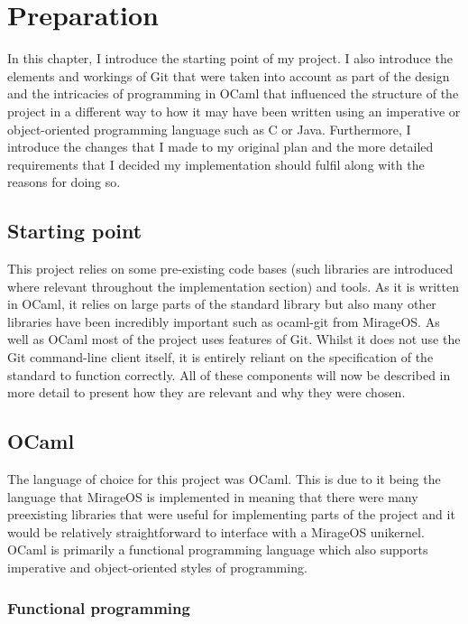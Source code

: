 \chapter{Preparation}

In this chapter, I introduce the starting point of my project. I also introduce the elements and workings of Git that were taken into account as part of the design and the intricacies of programming in OCaml that influenced the structure of the project in a different way to how it may have been written using an imperative or object-oriented programming language such as C or Java. Furthermore, I introduce the changes that I made to my original plan and the more detailed requirements that I decided my implementation should fulfil along with the reasons for doing so.

\section{Starting point}

This project relies on some pre-existing code bases (such libraries are introduced where relevant throughout the implementation section) and tools. As it is written in OCaml, it relies on large parts of the standard library but also many other libraries have been incredibly important such as ocaml-git from MirageOS. As well as OCaml most of the project uses features of Git. Whilst it does not use the Git command-line client itself, it is entirely reliant on the specification of the standard to function correctly. All of these components will now be described in more detail to present how they are relevant and why they were chosen.

\section{OCaml}

The language of choice for this project was OCaml\cite{code_ocaml}. This is due to it being the language that MirageOS is implemented in meaning that there were many preexisting libraries that were useful for implementing parts of the project and it would be relatively straightforward to interface with a MirageOS unikernel. OCaml is primarily a functional programming language which also supports imperative and object-oriented styles of programming.

\subsection{Functional programming}

